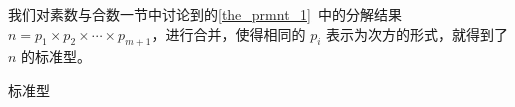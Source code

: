 
我们对素数与合数一节中讨论到的\autoref{the_prmnt_1}~中的分解结果 $n = p_1 \times p_2\times \cdots \times p_{m+1}$，进行合并，使得相同的 $p_i$ 表示为次方的形式，就得到了 $n$ 的标准型。
\begin{definition}{标准型}

\end{definition}
